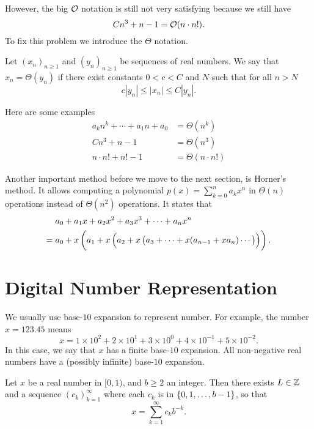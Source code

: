 \documentclass[11pt,a4paper]{article}
\begin{document}
However, the big $\mathcal{O}$ notation is still not very satisfying because
we still have
\[
  C n^3 + n - 1 = \mathcal{O}(n \cdot n!).
\]
To fix this problem we introduce the $\Theta$ notation.

\begin{definition}
  Let $(x_n)_{n \geq 1}$ and $(y_n)_{n \geq 1}$ be sequences of real numbers.
  We say that $x_n = \Theta(y_n)$ if there exist constants $0 < c < C$ and $N$ 
  such that for all $n > N$
  \[
    c |y_n| \le |x_n| \le C |y_n|.
  \]
\end{definition}

Here are some examples
\begin{align*}
  a_k n^k + \cdots + a_1 n + a_0 &= \Theta(n^k) \\
  Cn^3 + n - 1 &= \Theta(n^3) \\
  n \cdot n! + n! - 1 &= \Theta(n \cdot n!)
\end{align*}

Another important method before we move to the next section,
is Horner's method.
It allows computing a polynomial $p(x) = \sum_{k=0}^{n} a_k x^n$ in
$\Theta(n)$ operations instead of $\Theta(n^2)$ operations.
It states that
\[
  \begin{aligned}
    &a_{0} + a_{1}x + a_{2}x^{2} + a_{3}x^{3} + \cdots + a_{n}x^{n} \\ = {}
    &a_{0} + x\del{a_{1} + x\del{a_{2} + x\del{a_{3} + \cdots + 
    x(a_{n-1} + x a_{n}) \cdots}}}.
  \end{aligned}
\]

\section{Digital Number Representation}
We usually use base-$10$ expansion to represent number.
For example, the number $x = 123.45$ means
\[
  x = 1 \times 10^2 + 2 \times 10^1 + 3 \times 10^0 + 4 \times 10^{-1} +
    5 \times 10^{-2}.
\]
In this case, we say that $x$ has a finite base-$10$ expansion.
All non-negative real numbers have a (possibly infinite) base-$10$ expansion.

\begin{theorem}
  \label{thm:bases}
  Let $x$ be a real number in $[0,1)$, and $b \geq 2$ an integer.
  Then there exists $L \in \mathbb{Z}$ and a sequence $(c_k)_{k=1}^{\infty}$ where
  each $c_k$ is in $\set{0,1,\dots,b-1}$, so that
  \[
    x = \sum_{k=1}^{\infty} c_k b^{-k}.
  \]
\end{theorem}
\end{document}
